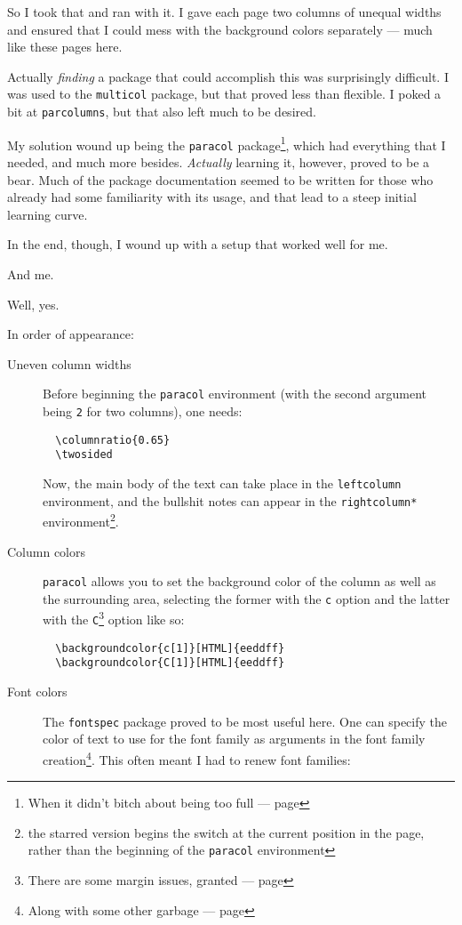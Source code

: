 \begin{paracol}{2}
\begin{leftcolumn}
So I took that and ran with it. I gave each page two columns of unequal widths and ensured that I could mess with the background colors separately --- much like these pages here.

Actually \emph{finding} a package that could accomplish this was surprisingly difficult. I was used to the \texttt{multicol} package, but that proved less than flexible. I poked a bit at \texttt{parcolumns}, but that also left much to be desired.

My solution wound up being the \texttt{paracol} package\footnote{When it didn't bitch about being too full --- page \pageref{toofull}}, which had everything that I needed, and much more besides. \emph{Actually} learning it, however, proved to be a bear. Much of the package documentation seemed to be written for those who already had some familiarity with its usage, and that lead to a steep initial learning curve.

In the end, though, I wound up with a setup that worked well for me.

\begin{ally}
  And me.
\end{ally}
Well, yes.

In order of appearance:

\begin{description}
  \item[Uneven column widths] Before beginning the \texttt{paracol} environment (with the second argument being \texttt{2} for two columns), one needs:

  \begin{verbatim}
  \columnratio{0.65}
  \twosided\end{verbatim}
  
  Now, the main body of the text can take place in the \texttt{leftcolumn} environment, and the bullshit notes can appear in the \texttt{rightcolumn*} environment\footnote{the starred version begins the switch at the current position in the page, rather than the beginning of the \texttt{paracol} environment}.
  \item[Column colors] \texttt{paracol} allows you to set the background color of the column as well as the surrounding area, selecting the former with the \texttt{c} option and the latter with the \texttt{C}\footnote{There are some margin issues, granted --- page \pageref{color-margins}} option like so:

  \begin{verbatim}
  \backgroundcolor{c[1]}[HTML]{eeddff}
  \backgroundcolor{C[1]}[HTML]{eeddff}\end{verbatim}
  \item[Font colors] The \texttt{fontspec} package proved to be most useful here. One can specify the color of text to use for the font family as arguments in the font family creation\footnote{Along with some other garbage --- page \pageref{ligatures}}. This often meant I had to renew font families:


\end{description}
\end{leftcolumn}
\end{paracol}
